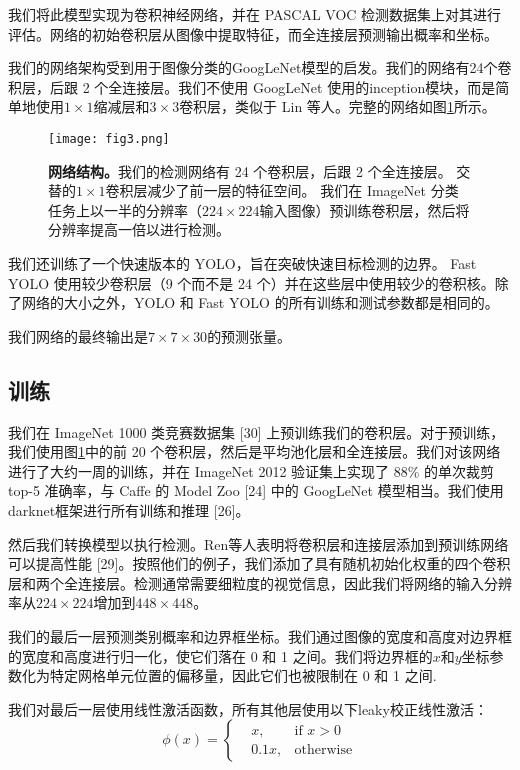 \documentclass[../main.tex]{subfile}
\begin{document}
我们将此模型实现为卷积神经网络，并在 PASCAL VOC 检测数据集\cite{pascal}上对其进行评估。网络的初始卷积层从图像中提取特征，而全连接层预测输出概率和坐标。

我们的网络架构受到用于图像分类的GoogLeNet模型的启发\cite{googlenet}。我们的网络有24个卷积层，后跟 2 个全连接层。我们不使用 GoogLeNet 使用的inception模块，而是简单地使用$ 1 \times 1 $缩减层和$ 3 \times 3 $卷积层，类似于 Lin 等人\cite{nin}。完整的网络如图\ref{fig:fig3}所示。

\begin{figure}[htb]
    \centering
    \texttt{[image: fig3.png]}
    \caption{\textbf{网络结构。}我们的检测网络有 24 个卷积层，后跟 2 个全连接层。 交替的$ 1 \times 1 $卷积层减少了前一层的特征空间。 我们在 ImageNet 分类任务上以一半的分辨率（$224 \times 224 $输入图像）预训练卷积层，然后将分辨率提高一倍以进行检测。}
    \label{fig:fig3}
\end{figure}

我们还训练了一个快速版本的 YOLO，旨在突破快速目标检测的边界。 Fast YOLO 使用较少卷积层（9 个而不是 24 个）并在这些层中使用较少的卷积核。除了网络的大小之外，YOLO 和 Fast YOLO 的所有训练和测试参数都是相同的。

我们网络的最终输出是$ 7 \times 7 \times 30 $的预测张量。

\subsection{训练}

我们在 ImageNet 1000 类竞赛数据集 [30] 上预训练我们的卷积层。对于预训练，我们使用图\ref{fig:fig3}中的前 20 个卷积层，然后是平均池化层和全连接层。我们对该网络进行了大约一周的训练，并在 ImageNet 2012 验证集上实现了 88\% 的单次裁剪 top-5 准确率，与 Caffe 的 Model Zoo [24] 中的 GoogLeNet 模型相当。我们使用darknet框架进行所有训练和推理 [26]。

然后我们转换模型以执行检测。Ren等人表明将卷积层和连接层添加到预训练网络可以提高性能 [29]。按照他们的例子，我们添加了具有随机初始化权重的四个卷积层和两个全连接层。检测通常需要细粒度的视觉信息，因此我们将网络的输入分辨率从$ 224 × 224 $增加到$ 448 × 448$。

我们的最后一层预测类别概率和边界框坐标。我们通过图像的宽度和高度对边界框的宽度和高度进行归一化，使它们落在 0 和 1 之间。我们将边界框的$ x $和$ y $坐标参数化为特定网格单元位置的偏移量，因此它们也被限制在 0 和 1 之间.

我们对最后一层使用线性激活函数，所有其他层使用以下leaky校正线性激活：
\begin{equation}
    \phi\left(x\right) = \left\{
    \begin{aligned}
         & x,    & \text{if }x > 0  \\
         & 0.1x, & \text{otherwise}
    \end{aligned}
    \right.
\end{equation}
\end{document}
